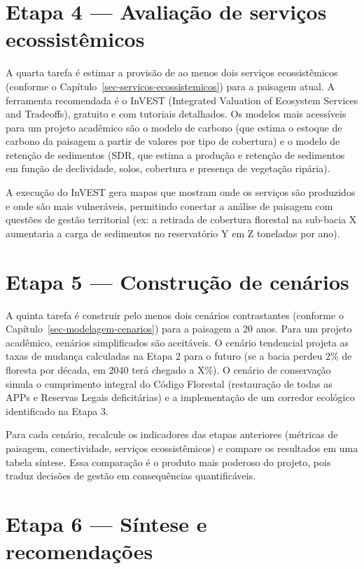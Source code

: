 \documentclass[
  portuguese,
  11pt,
  a4paper,
  open=any]{scrbook}
\begin{document}
\section{Etapa 4 --- Avaliação de serviços
ecossistêmicos}\label{etapa-4-avaliauxe7uxe3o-de-serviuxe7os-ecossistuxeamicos}

A quarta tarefa é estimar a provisão de ao menos dois serviços
ecossistêmicos (conforme o Capítulo~\ref{sec-servicos-ecossistemicos})
para a paisagem atual. A ferramenta recomendada é o InVEST (Integrated
Valuation of Ecosystem Services and Tradeoffs), gratuito e com tutoriais
detalhados. Os modelos mais acessíveis para um projeto acadêmico são o
modelo de carbono (que estima o estoque de carbono da paisagem a partir
de valores por tipo de cobertura) e o modelo de retenção de sedimentos
(SDR, que estima a produção e retenção de sedimentos em função de
declividade, solos, cobertura e presença de vegetação ripária).

A execução do InVEST gera mapas que mostram onde os serviços são
produzidos e onde são mais vulneráveis, permitindo conectar a análise de
paisagem com questões de gestão territorial (ex: a retirada de cobertura
florestal na sub-bacia X aumentaria a carga de sedimentos no
reservatório Y em Z toneladas por ano).

\section{Etapa 5 --- Construção de
cenários}\label{etapa-5-construuxe7uxe3o-de-cenuxe1rios}

A quinta tarefa é construir pelo menos dois cenários contrastantes
(conforme o Capítulo~\ref{sec-modelagem-cenarios}) para a paisagem a 20
anos. Para um projeto acadêmico, cenários simplificados são aceitáveis.
O cenário tendencial projeta as taxas de mudança calculadas na Etapa 2
para o futuro (se a bacia perdeu 2\% de floresta por década, em 2040
terá chegado a X\%). O cenário de conservação simula o cumprimento
integral do Código Florestal (restauração de todas as APPs e Reservas
Legais deficitárias) e a implementação de um corredor ecológico
identificado na Etapa 3.

Para cada cenário, recalcule os indicadores das etapas anteriores
(métricas de paisagem, conectividade, serviços ecossistêmicos) e compare
os resultados em uma tabela síntese. Essa comparação é o produto mais
poderoso do projeto, pois traduz decisões de gestão em consequências
quantificáveis.

\section{Etapa 6 --- Síntese e
recomendações}\label{etapa-6-suxedntese-e-recomendauxe7uxf5es}
\end{document}
